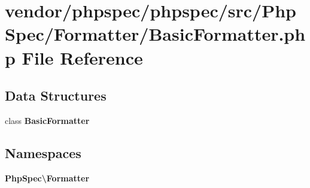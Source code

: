 \section{vendor/phpspec/phpspec/src/\+Php\+Spec/\+Formatter/\+Basic\+Formatter.php File Reference}
\label{_basic_formatter_8php}
\subsection*{Data Structures}
\begin{DoxyCompactItemize}
\item 
class {\bf Basic\+Formatter}
\end{DoxyCompactItemize}
\subsection*{Namespaces}
\begin{DoxyCompactItemize}
\item 
 {\bf Php\+Spec\textbackslash{}\+Formatter}
\end{DoxyCompactItemize}
